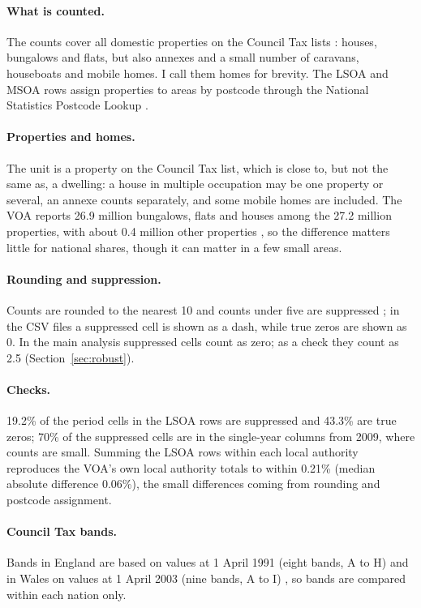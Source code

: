 \documentclass[11pt,a4paper]{article}
\begin{document}
\paragraph{What is counted.} The counts cover all domestic properties on the Council Tax lists \citep{voa2025bg}: houses, bungalows and flats, but also annexes and a small number of caravans, houseboats and mobile homes. I call them homes for brevity. The LSOA and MSOA rows assign properties to areas by postcode through the National Statistics Postcode Lookup \citep{voa2025bg}.

\paragraph{Properties and homes.} The unit is a property on the Council Tax list, which is close to, but not the same as, a dwelling: a house in multiple occupation may be one property or several, an annexe counts separately, and some mobile homes are included. The VOA reports 26.9 million bungalows, flats and houses among the 27.2 million properties, with about 0.4 million other properties \citep{voa2025com}, so the difference matters little for national shares, though it can matter in a few small areas.

\paragraph{Rounding and suppression.} Counts are rounded to the nearest 10 and counts under five are suppressed \citep{voa2025bg}; in the CSV files a suppressed cell is shown as a dash, while true zeros are shown as 0. In the main analysis suppressed cells count as zero; as a check they count as 2.5 (Section~\ref{sec:robust}).

\paragraph{Checks.} 19.2\% of the period cells in the LSOA rows are suppressed and 43.3\% are true zeros; 70\% of the suppressed cells are in the single-year columns from 2009, where counts are small. Summing the LSOA rows within each local authority reproduces the VOA's own local authority totals to within 0.21\% (median absolute difference 0.06\%), the small differences coming from rounding and postcode assignment.

\paragraph{Council Tax bands.} Bands in England are based on values at 1 April 1991 (eight bands, A to H) and in Wales on values at 1 April 2003 (nine bands, A to I) \citep{voa2025bg}, so bands are compared within each nation only.
\end{document}
